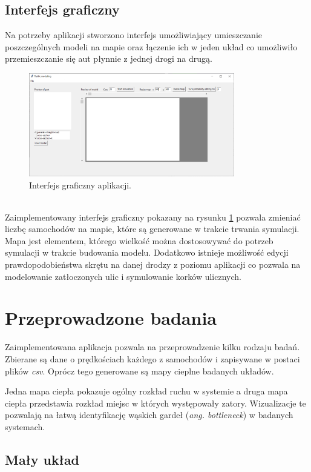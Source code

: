 \documentclass{article}
\begin{document}
\subsection{Interfejs graficzny}
Na potrzeby aplikacji stworzono interfejs umożliwiający umieszczanie poszczególnych modeli na mapie oraz łączenie ich w jeden układ co umożliwiło przemieszczanie się aut płynnie z jednej drogi na drugą. 
\begin{figure}[h]
    \centering
    \includegraphics[width=0.8\textwidth]{images/gui.PNG}
    \caption{Interfejs graficzny aplikacji.}
    \label{fig:gui}
\end{figure} \\
Zaimplementowany interfejs graficzny pokazany na rysunku \ref{fig:gui} pozwala zmieniać liczbę samochodów na mapie, które są generowane w trakcie trwania symulacji. Mapa jest elementem, którego wielkość można dostosowywać do potrzeb symulacji w trakcie budowania modelu. Dodatkowo istnieje możliwość edycji prawdopodobieństwa skrętu na danej drodzy z poziomu aplikacji co pozwala na modelowanie zatłoczonych ulic i symulowanie korków ulicznych.

\section{Przeprowadzone badania}

Zaimplementowana aplikacja pozwala na przeprowadzenie kilku rodzaju badań. Zbierane są dane o prędkościach każdego z samochodów i zapisywane w postaci plików \emph{csv}. Oprócz tego generowane są mapy cieplne badanych układów. 

Jedna mapa ciepła pokazuje ogólny rozkład ruchu w systemie a druga mapa ciepła przedstawia rozkład miejsc w których występowały zatory. Wizualizacje te pozwalają na łatwą identyfikację wąskich gardeł (\emph{ang. bottleneck}) w badanych systemach.

\subsection{Mały układ}
\end{document}
